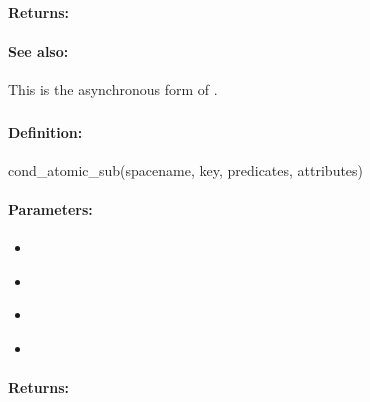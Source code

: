 \paragraph{Returns:}


\paragraph{See also:}  This is the asynchronous form of .

\pagebreak
\subsubsection{}
\label{api:ruby:cond_atomic_sub}


\paragraph{Definition:}
\begin{rubycode}
cond_atomic_sub(spacename, key, predicates, attributes)
\end{rubycode}

\paragraph{Parameters:}
\begin{itemize}[noitemsep]
\item {}\\

\item {}\\

\item {}\\

\item {}\\

\end{itemize}

\paragraph{Returns:}


